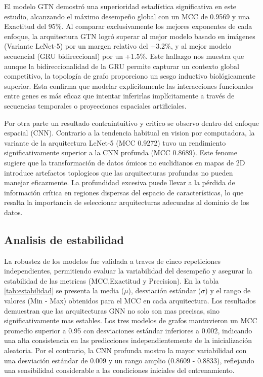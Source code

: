 \documentclass[review,12pt,times,number]{elsarticle}
\begin{document}
El modelo GTN demostró una superioridad estadística significativa en este estudio, alcanzando el máximo desempeño global con un MCC de 0.9569 y una Exactitud del 95\%. Al comparar exclusivamente los mejores exponentes de cada enfoque, la arquitectura GTN logró superar al mejor modelo basado en imágenes (Variante LeNet-5) por un margen relativo del +3.2\%, y al mejor modelo secuencial (GRU bidireccional) por un +1.5\%. Este hallazgo nos muestra que aunque la bidireccionalidad de la GRU permite capturar un contexto global competitivo, la topología de grafo proporciono un sesgo inductivo biológicamente superior. Esta confirma que modelar explícitamente las interacciones funcionales entre genes es más eficaz que intentar inferirlas implícitamente a través de secuencias temporales o proyecciones espaciales artificiales.

Por otra parte un resultado contraintuitivo y critico se observo dentro del enfoque espacial (CNN). Contrario a la tendencia habitual en vision por computadora, la variante de la arquitectura LeNet-5 (MCC 0.9272) tuvo un rendimiento significativamente superior a la CNN profunda (MCC 0.8689). Este fenome sugiere que la transformación de datos ómicos no euclidianos en mapas de 2D introduce artefactos toplogicos que las arquitecturas profundas no pueden manejar eficazmente. La profundidad excesiva puede llevar a la pérdida de información crítica en regiones dispersas del espacio de características, lo que resalta la importancia de seleccionar arquitecturas adecuadas al dominio de los datos.

\subsection{Analisis de estabilidad}

La robustez de los modelos fue validada a traves de cinco repeticiones independientes, permitiendo evaluar la variabilidad del desempeño y asegurar la estabilidad de las metricas (MCC,Exactitud y Precision). En la tabla \ref{tab:estabilidad} se presenta la media ($\mu$), desviación estándar ($\sigma$) y el rango de valores (Min - Max) obtenidos para el MCC en cada arquitectura. Los resultados demuestran que las arquitecturas GNN no solo son mas precisas, sino significativamente mas estables. Los tres modelos de grafos mantuvieron un MCC promedio superior a 0.95 con desviaciones estándar inferiores a 0.002, indicando una alta consistencia en las predicciones independientemente de la inicialización aleatoria. Por el contrario, la CNN profunda mostro la mayor variabilidad con una desviación estándar de 0.009 y un rango amplio (0.8609 - 0.8833), reflejando una sensibilidad considerable a las condiciones iniciales del entrenamiento.
\end{document}
